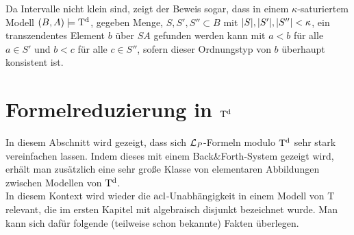 \begin{corollary}\label{Finden transz Elte}
	Da Intervalle nicht klein sind, zeigt der Beweis sogar, dass in einem $\kappa$-saturiertem Modell $(B,A)\models\operatorname{T^d}$, gegeben Menge, $S,S',S''\subset B$ mit ${\left| S \right|},{\left| S' \right|},{\left| S'' \right|}<\kappa$, ein transzendentes Element $b$ über $SA$ gefunden werden kann mit $a<b$ für alle $a\in S'$ und $b<c$ für alle $c\in S''$, sofern dieser Ordnungstyp von $b$ überhaupt konsistent ist.
\end{corollary}

\newpage

\section{Formelreduzierung in $\operatorname{T^d}$}
In diesem Abschnitt wird gezeigt, dass sich $\mathcal{L}_P$-Formeln modulo $\operatorname{T^d}$ sehr stark vereinfachen lassen. Indem dieses mit einem Back\&Forth-System gezeigt wird, erhält man zusätzlich eine sehr große Klasse von elementaren Abbildungen zwischen Modellen von $\operatorname{T^d}$.\\
In diesem Kontext wird wieder die $\operatorname{acl}$-Unabhängigkeit in einem Modell von T relevant, die im ersten Kapitel mit \glqq{}algebraisch disjunkt\grqq{} bezeichnet wurde. Man kann sich dafür folgende (teilweise schon bekannte) Fakten überlegen.

